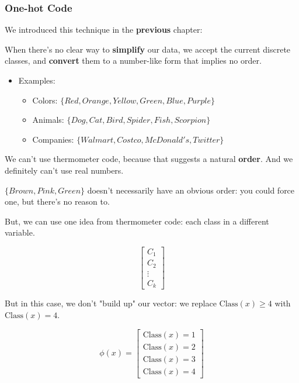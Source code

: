             \subsecdiv
            \subsubsection{One-hot Code}

                We introduced this technique in the \textbf{previous} chapter:
                
                When there's no clear way to \textbf{simplify} our data, we accept the current discrete classes, and \textbf{convert} them to a number-like form that implies no order.

                \begin{itemize}
                    \item Examples:
                    \begin{itemize}
                        \item Colors: $\{Red, Orange, Yellow, Green, Blue, Purple\}$
                        \item Animals: $\{Dog, Cat, Bird, Spider, Fish, Scorpion\}$
                        \item Companies: $\{Walmart, Costco, McDonald's, Twitter\}$
                    \end{itemize}
                \end{itemize}

                We can't use thermometer code, because that suggests a natural \textbf{order}. And we definitely can't use real numbers.

                \miniex $\{Brown, Pink, Green\}$ doesn't necessarily have an obvious order: you could force one, but there's no reason to.

                But, we can use one idea from thermometer code: each class in a different variable.
        
                \begin{equation}
                    \begin{bmatrix}
                      C_1\\C_2\\ \vdots \\ C_k
                    \end{bmatrix}
                \end{equation}

                But in this case, we don't "build up" our vector: we replace $\text{Class}(x)\geq 4$ with $\text{Class}(x)= 4$.

                \begin{equation}
                \phi(x) =
                \begin{bmatrix}
                \text{Class}(x) = 1 \\
                \text{Class}(x) = 2 \\
                \text{Class}(x) = 3 \\
                \text{Class}(x) = 4
                \end{bmatrix}
                \end{equation}
                
